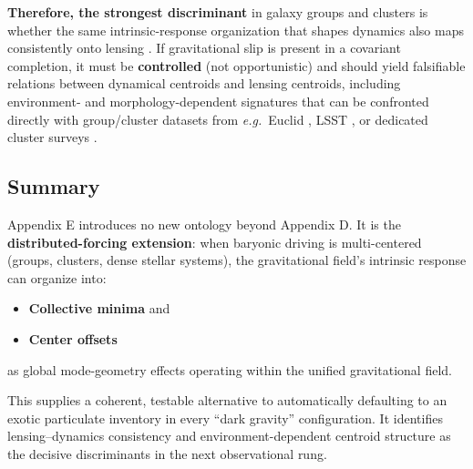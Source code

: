 \textbf{Therefore, the strongest discriminant} in galaxy groups and clusters is whether the 
same intrinsic-response organization that shapes dynamics also maps consistently onto lensing \citep{Clowe2006Bullet}. 
If gravitational slip is present in a covariant completion, it must be \textbf{controlled} 
(not opportunistic) and should yield falsifiable relations between dynamical centroids and 
lensing centroids, including environment- and morphology-dependent signatures that can be 
confronted directly with group/cluster datasets from \textit{e.g.}\ Euclid \citep{Euclid2025Overview}, LSST \citep{Ivezic2019LSST}, or 
dedicated cluster surveys \citep{MAST2019HFF}.

\subsection{Summary}\label{e.8-summary}

Appendix E introduces no new ontology beyond Appendix D. It is the \textbf{distributed-forcing 
extension}: when baryonic driving is multi-centered (groups, clusters, dense stellar systems), 
the gravitational field's intrinsic response can organize into:
\begin{itemize}
  \item \textbf{Collective minima} and
  \item \textbf{Center offsets}
\end{itemize}
as global mode-geometry effects operating within the unified gravitational field.

This supplies a coherent, testable alternative to automatically defaulting to an exotic 
particulate inventory in every ``dark gravity'' configuration. It identifies lensing--dynamics 
consistency and environment-dependent centroid structure as the decisive discriminants in the 
next observational rung.

